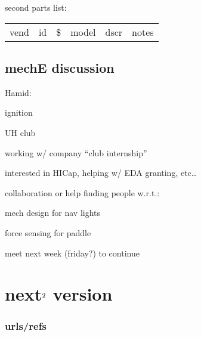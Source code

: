 \documentclass[12pt]{article} %
\begin{document}
second parts list:
\begin{tabu}{cccccc}
vend & id & \$ & model & dscr & notes

\end{tabu}


\subsection{mechE discussion}

Hamid:
\begin{compactitem}
\item ignition
	\begin{compactitem}
	\item UH club
	\item working w/ company ``club internship''
	\item interested in HICap, helping w/ EDA granting, etc\dots
	\end{compactitem}
\item collaboration or help finding people w.r.t.:
	\begin{compactitem}
	\item mech design for nav lights
	\item force sensing for paddle 
	\end{compactitem}
\item meet next week (friday?) to continue
\end{compactitem}

\section{next$^{\textrm 2}$ version}

\subsubsection{urls/refs}
\end{document}
